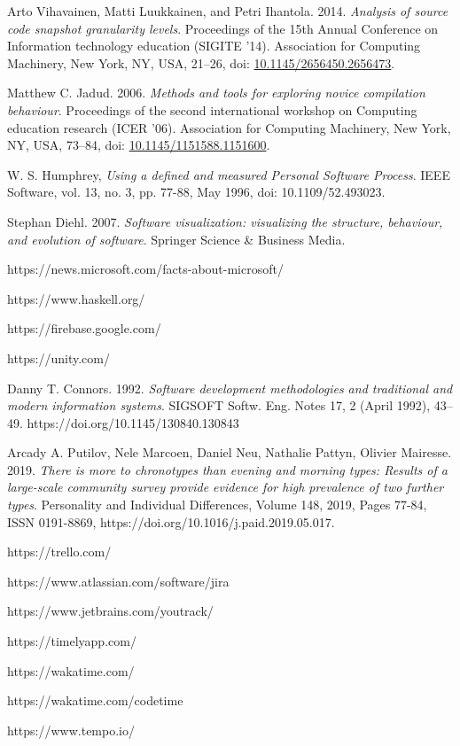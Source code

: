 \begin{thebibliography}{99}
 Arto Vihavainen, Matti Luukkainen, and Petri Ihantola. 2014. \textit{Analysis of source code snapshot granularity levels}. Proceedings of the 15th Annual Conference on Information technology education (SIGITE '14). Association for Computing Machinery, New York, NY, USA, 21–26, doi: \href{https://doi.org/10.1145/2656450.2656473}{10.1145/2656450.2656473}.

 Matthew C. Jadud. 2006. \textit{Methods and tools for exploring novice compilation behaviour}. Proceedings of the second international workshop on Computing education research (ICER '06). Association for Computing Machinery, New York, NY, USA, 73–84, doi: \href{https://doi.org/10.1145/1151588.1151600}{10.1145/1151588.1151600}.

 W. S. Humphrey, \textit{Using a defined and measured Personal Software Process}. IEEE Software, vol. 13, no. 3, pp. 77-88, May 1996, doi: 10.1109/52.493023.

 Stephan Diehl. 2007. \textit{Software visualization: visualizing the structure, behaviour, and evolution of software}. Springer Science \& Business Media.

 https://news.microsoft.com/facts-about-microsoft/

 https://www.haskell.org/

 https://firebase.google.com/

 https://unity.com/

 Danny T. Connors. 1992. \textit{Software development methodologies and traditional and modern information systems}. SIGSOFT Softw. Eng. Notes 17, 2 (April 1992), 43–49. https://doi.org/10.1145/130840.130843

 Arcady A. Putilov, Nele Marcoen, Daniel Neu, Nathalie Pattyn, Olivier Mairesse. 2019. \textit{There is more to chronotypes than evening and morning types: Results of a large-scale community survey provide evidence for high prevalence of two further types}. Personality and Individual Differences, Volume 148, 2019, Pages 77-84, ISSN 0191-8869, https://doi.org/10.1016/j.paid.2019.05.017.

 https://trello.com/

 https://www.atlassian.com/software/jira

 https://www.jetbrains.com/youtrack/

 https://timelyapp.com/

 https://wakatime.com/

 https://wakatime.com/codetime

 https://www.tempo.io/

\end{thebibliography}


